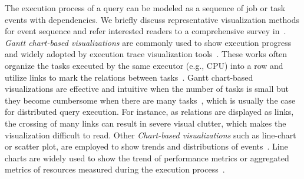 The execution process of a query can be modeled as a sequence of job or task events with dependencies.
We briefly discuss representative visualization methods for event sequence and refer interested readers to a comprehensive survey in~\cite{guo2021survey}. \textit{Gantt chart-based visualizations} are commonly used to show execution progress and widely adopted by execution trace visualization tools~\cite{tezui, sparkui, nagel1996vampir, drebes2014aftermath, moritz2015perfopticon, battle2016making, pinto2016analyzing, xie2018visual, sakin2022traveler}. 
These works often organize the tasks executed by the same executor (e.g., CPU) into a row and utilize links to mark the relations between tasks~\cite{pinto2016analyzing, nagel1996vampir, xie2018visual}. 
Gantt chart-based visualizations are effective and intuitive when the number of tasks is small but they become cumbersome when there are many tasks~\cite{sigovan2013visualizing}, which is usually the case for distributed query execution. 
For instance, as relations are displayed as links, the crossing of many links can result in severe visual clutter, which makes the visualization difficult to read. 
Other \textit{Chart-based visualizations} such as line-chart or scatter plot, are employed to show trends and distributions of events~\cite{wu2020visual, malik2016high, gotz2019visual, sigovan2013visualizing, chen2014visual, micallef2017towards}.
Line charts are widely used to show the trend of performance metrics or aggregated metrics of resources measured during the execution process~\cite{li2019visual, kesavan2020visual, fujiwara2018visual}. 
